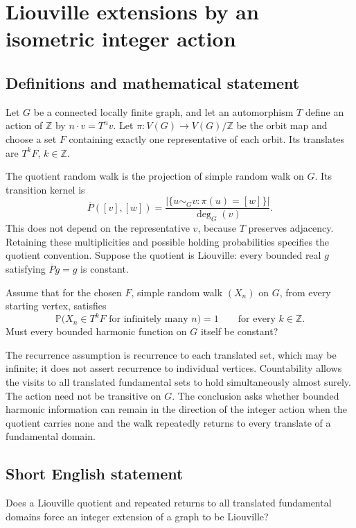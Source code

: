 \documentclass[11pt,a4paper]{article}
\begin{document}
\section*{Liouville extensions by an isometric integer action}\label{statement}

\subsection{Definitions and mathematical statement}
Let $G$ be a connected locally finite graph, and let an automorphism $T$ define an action of $\mathbb Z$ by $n\cdot v=T^nv$. Let $\pi:V(G)\to V(G)/\mathbb Z$ be the orbit map and choose a set $F$ containing exactly one representative of each orbit. Its translates are $T^kF$, $k\in\mathbb Z$.

The quotient random walk is the projection of simple random walk on $G$. Its transition kernel is
\[
\overline P([v],[w])=
\frac{|\{u\sim_Gv:\pi(u)=[w]\}|}{\deg_G(v)}.
\]
This does not depend on the representative $v$, because $T$ preserves adjacency. Retaining these multiplicities and possible holding probabilities specifies the quotient convention. Suppose the quotient is Liouville: every bounded real $g$ satisfying $\overline Pg=g$ is constant.

Assume that for the chosen $F$, simple random walk $(X_n)$ on $G$, from every starting vertex, satisfies
\[
\mathbb P\bigl(X_n\in T^kF\text{ for infinitely many }n\bigr)=1
\qquad\text{for every }k\in\mathbb Z.
\]
Must every bounded harmonic function on $G$ itself be constant?

The recurrence assumption is recurrence to each translated set, which may be infinite; it does not assert recurrence to individual vertices. Countability allows the visits to all translated fundamental sets to hold simultaneously almost surely. The action need not be transitive on $G$. The conclusion asks whether bounded harmonic information can remain in the direction of the integer action when the quotient carries none and the walk repeatedly returns to every translate of a fundamental domain.
\subsection{Short English statement}
Does a Liouville quotient and repeated returns to all translated fundamental domains force an integer extension of a graph to be Liouville?
\end{document}
